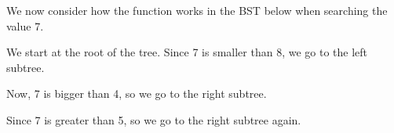 \documentclass[a4paper, openany]{memoir}
\begin{document}
\noindent We now consider how the function works in the BST below when searching the value 7.
\begin{center}
\end{center}
We start at the root of the tree. Since 7 is smaller than 8, we go to the left subtree.
\begin{center}
\end{center}
Now, 7 is bigger than 4, so we go to the right subtree.
\begin{center}
\end{center}
Since 7 is greater than 5, so we go to the right subtree again.
\end{document}
